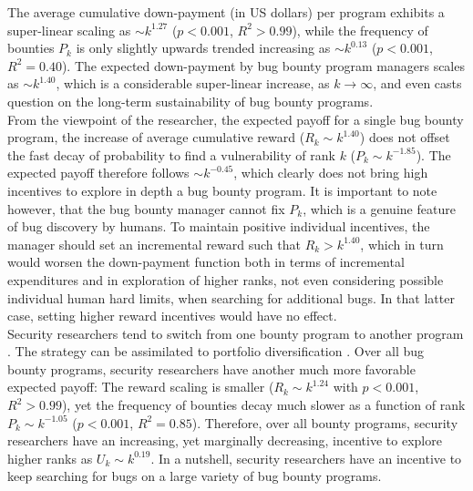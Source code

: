 The average cumulative down-payment (in US dollars) per program exhibits a super-linear scaling as $\sim k^{1.27}$ ($ p < 0.001$, $R^2 > 0.99$), while the frequency of bounties $P_k$ is only slightly upwards trended increasing as $ \sim k^{0.13}$ ($ p < 0.001$, $R^2 = 0.40$). The expected down-payment by bug bounty program managers scales as $\sim k^{1.40}$, which is a considerable super-linear increase, as $k \rightarrow \infty$, and even casts question on the long-term sustainability of bug bounty programs. \\

From the viewpoint of the researcher, the expected payoff for a single bug bounty program, the increase of average cumulative reward ($R_{k} \sim k^{1.40}$) does not offset the fast decay of probability to find a vulnerability of rank $k$ ($P_{k} \sim k^{-1.85}$). The expected payoff therefore follows $\sim k^{-0.45}$, which clearly does not bring high incentives to explore in depth a bug bounty program. It is important to note however, that the bug bounty manager cannot fix $P_k$, which is a genuine feature of bug discovery by humans. To maintain positive individual incentives, the manager should set an incremental reward such that $R_k > k^{1.40}$, which in turn would worsen the down-payment function both in terms of incremental expenditures and in exploration of higher ranks, not even considering possible individual human hard limits, when searching for additional bugs. In that latter case, setting higher reward incentives would have no effect.\\

Security researchers tend to switch from one bounty program to another program \cite{zhao2014exploratory,zhao2015empirical}. The strategy can be assimilated to portfolio diversification \cite{goetzmann2008equity}. Over all bug bounty programs, security researchers have another much more favorable expected payoff: The reward scaling is smaller ($R_{k} \sim k^{1.24}$ with $ p < 0.001$, $R^2 > 0.99$), yet the frequency of bounties decay much slower as a function of rank $P_{k} \sim k^{-1.05}$ ($ p < 0.001$, $R^2 = 0.85$). Therefore, over all bounty programs, security researchers have an increasing, yet marginally decreasing, incentive to explore higher ranks as $U_k \sim k^{0.19}$. In a nutshell, security researchers have an incentive to keep searching for bugs on a large variety of bug bounty programs. 

